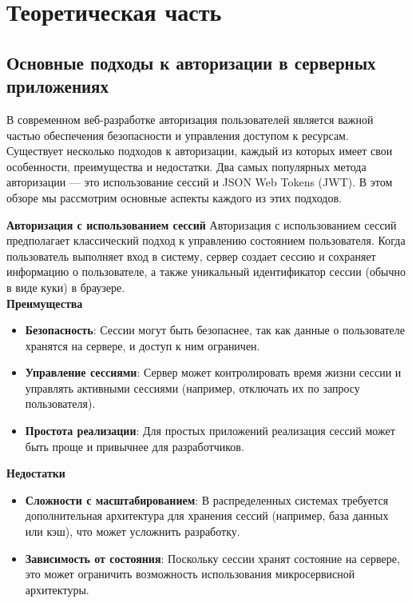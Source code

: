 \chapter{Теоретическая часть}

\section{Основные подходы к авторизации в серверных приложениях}

В современном веб-разработке авторизация пользователей является важной частью обеспечения безопасности и управления доступом к ресурсам\cite{mann2020oauth}. Существует несколько подходов к авторизации, каждый из которых имеет свои особенности, преимущества и недостатки. Два самых популярных метода авторизации — это использование сессий и JSON Web Tokens (JWT). В этом обзоре мы рассмотрим основные аспекты каждого из этих подходов.


\textbf{Авторизация с использованием сессий}
Авторизация с использованием сессий предполагает классический подход к управлению состоянием пользователя\cite{wilson2021session}.
Когда пользователь выполняет вход в систему, сервер создает сессию и сохраняет информацию о пользователе, 
а также уникальный идентификатор сессии (обычно в виде куки) в браузере.\\
\textbf{Преимущества}
\begin{itemize}
    \item \textbf{Безопасность}: Сессии могут быть безопаснее, так как данные о пользователе хранятся на сервере, и доступ к ним ограничен.
    \item \textbf{Управление сессиями}: Сервер может контролировать время жизни сессии и управлять активными сессиями (например, отключать их по запросу пользователя).
    \item \textbf{Простота реализации}: Для простых приложений реализация сессий может быть проще и привычнее для разработчиков.
\end{itemize}

\textbf{Недостатки}
\begin{itemize}
    \item \textbf{Сложности с масштабированием}: В распределенных системах требуется дополнительная архитектура для хранения сессий (например, база данных или кэш), что может усложнить разработку.
    \item \textbf{Зависимость от состояния}: Поскольку сессии хранят состояние на сервере, это может ограничить возможность использования микросервисной архитектуры.
\end{itemize}


